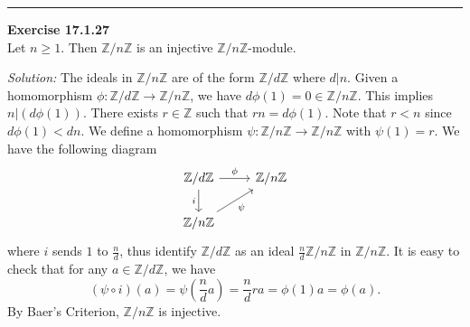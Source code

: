 \documentclass[a4paper, 12pt]{article}
\newenvironment{problem}[2][Exercise]
    { \begin{mdframed}[backgroundcolor=gray!20] \textbf{#1 #2} \\}
    {  \end{mdframed}}
\newenvironment{solution}
    {\textit{Solution:}}
    {}
\begin{document}
\noindent\rule{7in}{2.8pt}
\begin{problem}{17.1.27}
Let \(n\geq 1\). Then \(\mathbb{Z}/n \mathbb{Z}\) is an injective \(\mathbb{Z}/n \mathbb{Z}\)-module.
\end{problem}
\begin{solution}
The ideals in \(\mathbb{Z}/n \mathbb{Z}\) are of the form \(\mathbb{Z}/d \mathbb{Z}\) where \(d|n\). Given a homomorphism \(\phi: \mathbb{Z}/d \mathbb{Z}\rightarrow \mathbb{Z}/n \mathbb{Z}\), we have \(d\phi(1)=0\in \mathbb{Z}/n \mathbb{Z}\). This implies 
\(n|(d\phi(1))\). There exists \(r\in \mathbb{Z}\) such that \(rn=d\phi(1)\). Note that \(r<n\) since \(d\phi(1)<dn\). We define a homomorphism \(\psi:\mathbb{Z}/n \mathbb{Z}\rightarrow \mathbb{Z}/n \mathbb{Z}\) with \(\psi(1)=r\). We have the following diagram 
\[\begin{tikzcd}
	{\mathbb{Z}/d\mathbb{Z}} & {\mathbb{Z}/n\mathbb{Z}} \\
	{\mathbb{Z}/n\mathbb{Z}}
	\arrow["\phi", from=1-1, to=1-2]
	\arrow["i"', from=1-1, to=2-1]
	\arrow["\psi"', from=2-1, to=1-2]
\end{tikzcd}\]
where \(i\) sends \(1\) to \(\frac{n}{d}\), thus identify \(\mathbb{Z}/d \mathbb{Z}\) as an ideal \(\frac{n}{d} \mathbb{Z}/n \mathbb{Z}\) in \(\mathbb{Z}/n \mathbb{Z}\). It is easy to check that for  any \(a\in \mathbb{Z}/d \mathbb{Z}\), we have 
\[(\psi\circ i)(a)=\psi(\frac{n}{d}a)=\frac{n}{d}ra=\phi(1)a=\phi(a).\]
By Baer's Criterion, \(\mathbb{Z}/n \mathbb{Z}\) is injective.
\end{solution}
\end{document}
